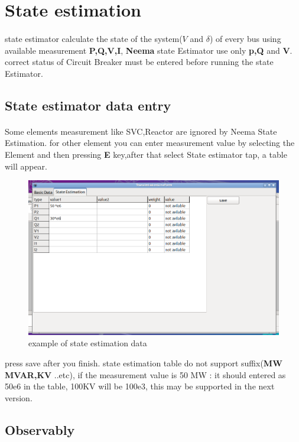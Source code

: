 \documentclass{article}
\begin{document}
\section{State estimation}
\paragraph{} state estimator calculate the state of the system($V$ and $\delta$) of every bus using available measurement \textbf{P,Q,V,I}, \textbf{Neema} state Estimator use only \textbf{p,Q} and \textbf{V}. correct status of Circuit Breaker must be entered before running the state Estimator.
\subsection{State estimator data entry}
\paragraph{} Some elements measurement like SVC,Reactor are ignored by Neema State Estimation. for other element you can enter measurement value by selecting the Element and then pressing \textbf{E} key,after that select State estimator tap, a table will appear.
\begin{figure}[H]
	\includegraphics[width=12 cm]{linees.png}
	\caption{example of state estimation data}
	\label{fig:linesex}
\end{figure}
press save after you finish.
state estimation table do not support suffix(\textbf{MW MVAR,KV} ..etc), if the measurement value is 50 MW : it should entered as 50e6 in the table, 100KV will be 100e3, this may be supported in the next version.
\subsection{Observably}
\end{document}

